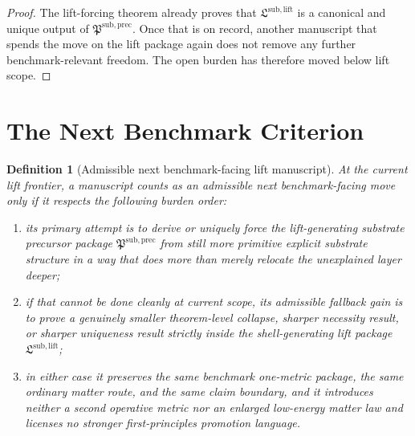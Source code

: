 \documentclass[11pt]{article}
\newcommand{\LiftPackage}{\mathfrak L^{\mathrm{sub,lift}}}
\newcommand{\PrecursorPackage}{\mathfrak P^{\mathrm{sub,prec}}}
\newtheorem{definition}{Definition}
\begin{document}
\begin{proof}
The lift-forcing theorem already proves that \(\LiftPackage\) is a canonical and unique output of \(\PrecursorPackage\). Once that is on record, another manuscript that spends the move on the lift package again does not remove any further benchmark-relevant freedom. The open burden has therefore moved below lift scope.
\end{proof}

\section{The Next Benchmark Criterion}

\begin{definition}[Admissible next benchmark-facing lift manuscript]
At the current lift frontier, a manuscript counts as an admissible next benchmark-facing move only if it respects the following burden order:
\begin{enumerate}
    \item its primary attempt is to derive or uniquely force the lift-generating substrate precursor package \(\PrecursorPackage\) from still more primitive explicit substrate structure in a way that does more than merely relocate the unexplained layer deeper;
    \item if that cannot be done cleanly at current scope, its admissible fallback gain is to prove a genuinely smaller theorem-level collapse, sharper necessity result, or sharper uniqueness result strictly inside the shell-generating lift package \(\LiftPackage\);
    \item in either case it preserves the same benchmark one-metric package, the same ordinary matter route, and the same claim boundary, and it introduces neither a second operative metric nor an enlarged low-energy matter law and licenses no stronger first-principles promotion language.
\end{enumerate}
\end{definition}
\end{document}
